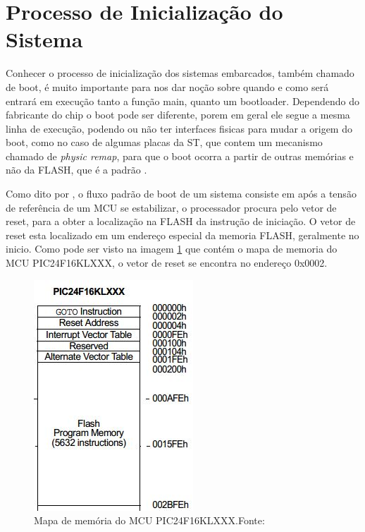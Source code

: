 \section{\textbf{Processo de Inicialização do Sistema}}

Conhecer o processo de inicialização dos sistemas embarcados, também chamado de boot, é muito importante para nos dar noção sobre quando e como será entrará em execução tanto a função main, quanto um bootloader. Dependendo do fabricante do chip o boot pode ser diferente, porem em geral ele segue a mesma linha de execução, podendo ou não ter interfaces fisicas para mudar a origem do boot, como no caso de algumas placas da ST, que contem um mecanismo chamado de \textit{physic remap}, para que o boot ocorra a partir de outras memórias e não da FLASH, que é a padrão \cite{Noviello2018}.

Como dito por , o fluxo padrão de boot de um sistema consiste em após a tensão de referência de um MCU se estabilizar, o processador procura pelo vetor de reset, para a obter a localização na FLASH da instrução de iniciação. O vetor de reset esta localizado em um endereço especial da memoria FLASH, geralmente no inicio. Como pode ser visto na imagem \ref{MAP_PIC24F16KLXXX} que contém o mapa de memoria do MCU PIC24F16KLXXX, o vetor de reset se encontra no endereço 0x0002.

\begin{figure}[H]
    \scriptsize
     \centering
     \includegraphics[scale=1]{dados/figuras/ResetVector.jpg}
     \caption{Mapa de memória do MCU PIC24F16KLXXX.\newline Fonte: \cite{Beningo2015}}
     \label{MAP_PIC24F16KLXXX}
\end{figure}

